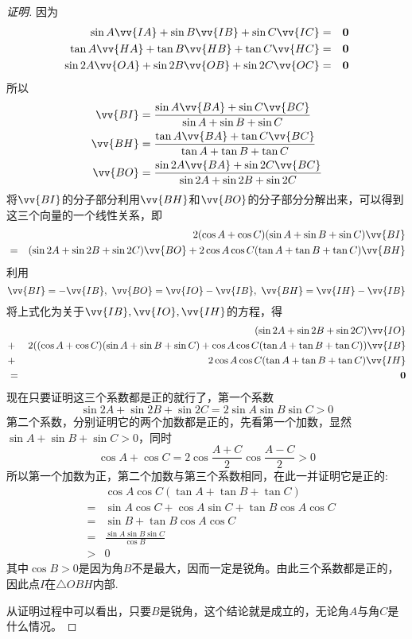 \begin{proof}[证明]
因为
\begin{eqnarray*}
\sin{A} \vv{IA} + \sin{B} \vv{IB} + \sin{C} \vv{IC} & = & \bm{0} \\
\tan{A} \vv{HA} + \tan{B} \vv{HB} + \tan{C} \vv{HC} & = & \bm{0} \\
\sin{2A} \vv{OA} + \sin{2B} \vv{OB} + \sin{2C} \vv{OC} & = & \bm{0} 
\end{eqnarray*}
所以
\begin{align*}
\vv{BI} & = \frac{\sin{A} \vv{BA} +\sin{C} \vv{BC}}{\sin{A}+\sin{B}+\sin{C}} \\
\vv{BH} & = \frac{\tan{A} \vv{BA} +\tan{C} \vv{BC}}{\tan{A}+\tan{B}+\tan{C}}  \\
\vv{BO} & = \frac{\sin{2A} \vv{BA} +\sin{2C} \vv{BC}}{\sin{2A}+\sin{2B}+\sin{2C}} 
\end{align*}
将$\vv{BI}$的分子部分利用$\vv{BH}$和$\vv{BO}$的分子部分分解出来，可以得到这三个向量的一个线性关系，即
\begin{eqnarray*}
& & 2(\cos{A}+\cos{C})(\sin{A}+\sin{B}+\sin{C}) \vv{BI} \\
&=& (\sin{2A}+\sin{2B}+\sin{2C}) \vv{BO} + 2\cos{A}\cos{C}(\tan{A}+\tan{B}+\tan{C}) \vv{BH}
\end{eqnarray*}
利用
\[ \vv{BI}=-\vv{IB}, \  \vv{BO}=\vv{IO}-\vv{IB}, \  \vv{BH}=\vv{IH}-\vv{IB} \]
将上式化为关于$\vv{IB},\vv{IO},\vv{IH}$的方程，得
\begin{eqnarray*}
&& (\sin{2A}+\sin{2B}+\sin{2C}) \vv{IO} \\
& + & 2((\cos{A}+\cos{C})(\sin{A}+\sin{B}+\sin{C}) + \cos{A}\cos{C}(\tan{A}+\tan{B}+\tan{C}) ) \vv{IB} \\
& + & 2 \cos{A}\cos{C}(\tan{A}+\tan{B}+\tan{C}) \vv{IH} \\
& = & \bm{0}
\end{eqnarray*}
现在只要证明这三个系数都是正的就行了，第一个系数
\[ \sin{2A}+\sin{2B}+\sin{2C} = 2\sin{A}\sin{B}\sin{C} > 0 \]
第二个系数，分别证明它的两个加数都是正的，先看第一个加数，显然$\sin{A}+\sin{B}+\sin{C}>0$，同时
\[ \cos{A}+\cos{C}=2\cos{\frac{A+C}{2}}\cos{\frac{A-C}{2}}>0 \]
所以第一个加数为正，第二个加数与第三个系数相同，在此一并证明它是正的:
\begin{eqnarray*}
&& \cos{A}\cos{C}(\tan{A}+\tan{B}+\tan{C})  \\
&= & \sin{A}\cos{C}+\cos{A}\sin{C}+\tan{B}\cos{A}\cos{C} \\
&= & \sin{B} + \tan{B}\cos{A}\cos{C} \\
&= & \frac{\sin{A}\sin{B}\sin{C}}{\cos{B}} \\
&> & 0
\end{eqnarray*}
其中$\cos{B}>0$是因为角$B$不是最大，因而一定是锐角。由此三个系数都是正的，因此点$I$在$\triangle OBH$内部.

从证明过程中可以看出，只要$B$是锐角，这个结论就是成立的，无论角$A$与角$C$是什么情况。
\end{proof}




